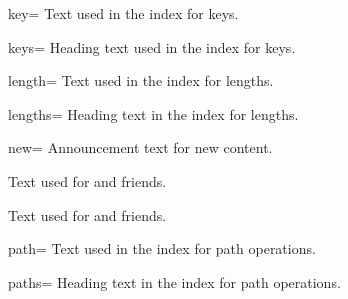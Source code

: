 \begin{langTcbKey}{key}{=}{}
  Text used in the index for keys.
\end{langTcbKey}

\begin{langTcbKey}{keys}{=}{}
  Heading text used in the index for keys.
\end{langTcbKey}

\begin{langTcbKey}[][doc new={2015-01-08}]{length}{=}{}
  Text used in the index for lengths.
\end{langTcbKey}

\begin{langTcbKey}[][doc new={2015-01-08}]{lengths}{=}{}
  Heading text in the index for lengths.
\end{langTcbKey}

\begin{langTcbKey}[][doc new={2014-09-19}]{new}{=}{}
  Announcement text for new content.
\end{langTcbKey}

\clearpage

\begin{langTcbKeys}[
    doc name              = nodefault,
    doc parameter eq meta = text,
    doc description init  = no default,
    doc new               = 2026-05-26
  ]{}
  Text used for  and friends.
\end{langTcbKeys}

\begin{langTcbKeys}[
    doc name              = noinitially,
    doc parameter eq meta = text,
    doc description init  = initially unset,
    doc new               = 2026-05-26
  ]{}
  Text used for  and friends.
\end{langTcbKeys}

\begin{langTcbKey}[][doc new={2019-09-18}]{path}{=}{}
  Text used in the index for path operations.
\end{langTcbKey}

\begin{langTcbKey}[][doc new={2019-09-18}]{paths}{=}{}
  Heading text in the index for path operations.
\end{langTcbKey}


